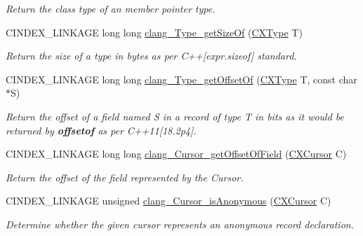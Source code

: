 \begin{DoxyCompactItemize}
\begin{DoxyCompactList}\small\item\em Return the class type of an member pointer type. \end{DoxyCompactList}\item 
C\+I\+N\+D\+E\+X\+\_\+\+L\+I\+N\+K\+A\+GE long long \mbox{\hyperlink{group__CINDEX__TYPES_ga027abe334546e80931905f31399d0a8b}{clang\+\_\+\+Type\+\_\+get\+Size\+Of}} (\mbox{\hyperlink{structCXType}{C\+X\+Type}} T)
\begin{DoxyCompactList}\small\item\em Return the size of a type in bytes as per C++\mbox{[}expr.\+sizeof\mbox{]} standard. \end{DoxyCompactList}\item 
C\+I\+N\+D\+E\+X\+\_\+\+L\+I\+N\+K\+A\+GE long long \mbox{\hyperlink{group__CINDEX__TYPES_gab543536d5c18efb3e23a1b7903fb494d}{clang\+\_\+\+Type\+\_\+get\+Offset\+Of}} (\mbox{\hyperlink{structCXType}{C\+X\+Type}} T, const char $\ast$S)
\begin{DoxyCompactList}\small\item\em Return the offset of a field named S in a record of type T in bits as it would be returned by {\bfseries offsetof} as per C++11\mbox{[}18.\+2p4\mbox{]}. \end{DoxyCompactList}\item 
C\+I\+N\+D\+E\+X\+\_\+\+L\+I\+N\+K\+A\+GE long long \mbox{\hyperlink{group__CINDEX__TYPES_gaa7e0f0ec320c645e971168ac39aa0cab}{clang\+\_\+\+Cursor\+\_\+get\+Offset\+Of\+Field}} (\mbox{\hyperlink{structCXCursor}{C\+X\+Cursor}} C)
\begin{DoxyCompactList}\small\item\em Return the offset of the field represented by the Cursor. \end{DoxyCompactList}\item 
\mbox{\label{group__CINDEX__TYPES_ga6e0d2674d126fd43816ce3a80b592373}} 
C\+I\+N\+D\+E\+X\+\_\+\+L\+I\+N\+K\+A\+GE unsigned \mbox{\hyperlink{group__CINDEX__TYPES_ga6e0d2674d126fd43816ce3a80b592373}{clang\+\_\+\+Cursor\+\_\+is\+Anonymous}} (\mbox{\hyperlink{structCXCursor}{C\+X\+Cursor}} C)
\begin{DoxyCompactList}\small\item\em Determine whether the given cursor represents an anonymous record declaration. \end{DoxyCompactList}\item 
\mbox{\label{group__CINDEX__TYPES_ga13f25981892e38c345d609b56ae1ee9c}} 

\end{DoxyCompactItemize}
